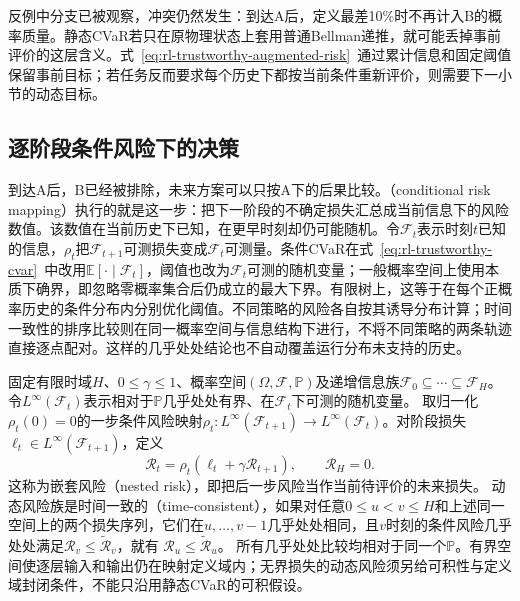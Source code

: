 反例中分支已被观察，冲突仍然发生：到达A后，定义最差10\%时不再计入B的概率质量。静态CVaR若只在原物理状态上套用普通Bellman递推，就可能丢掉事前评价的这层含义。式~\eqref{eq:rl-trustworthy-augmented-risk}~通过累计信息和固定阈值保留事前目标；若任务反而要求每个历史下都按当前条件重新评价，则需要下一小节的动态目标。

\subsection{逐阶段条件风险下的决策}
\label{sec:rl-trustworthy-dynamic-risk}

到达A后，B已经被排除，未来方案可以只按A下的后果比较。（conditional risk mapping）执行的就是这一步：把下一阶段的不确定损失汇总成当前信息下的风险数值。该数值在当前历史下已知，在更早时刻却仍可能随机。令$\mathcal F_t$表示时刻$t$已知的信息，$\rho_t$把$\mathcal F_{t+1}$可测损失变成$\mathcal F_t$可测量。条件CVaR在式~\eqref{eq:rl-trustworthy-cvar}~中改用$\mathbb E[\cdot\mid\mathcal F_t]$，阈值也改为$\mathcal F_t$可测的随机变量；一般概率空间上使用本质下确界，即忽略零概率集合后仍成立的最大下界。有限树上，这等于在每个正概率历史的条件分布内分别优化阈值。不同策略的风险各自按其诱导分布计算；时间一致性的排序比较则在同一概率空间与信息结构下进行，不将不同策略的两条轨迹直接逐点配对。这样的几乎处处结论也不自动覆盖运行分布未支持的历史。

\begin{definition}[嵌套风险与时间一致性]
  \label{def:rl-trustworthy-time-consistency}
  固定有限时域$H$、$0\leq\gamma\leq1$、概率空间$(\Omega,\mathcal F,\mathbb P)$及递增信息族$\mathcal F_0\subseteq\cdots\subseteq\mathcal F_H$。令$L^\infty(\mathcal F_t)$表示相对于$\mathbb P$几乎处处有界、在$\mathcal F_t$下可测的随机变量。
  取归一化$\rho_t(0)=0$的一步条件风险映射$\rho_t:L^\infty(\mathcal F_{t+1})\to L^\infty(\mathcal F_t)$。对阶段损失$\ell_t\in L^\infty(\mathcal F_{t+1})$，定义
  \[
    \mathcal R_t
      =\rho_t(\ell_t+\gamma\mathcal R_{t+1}),
      \qquad \mathcal R_H=0.
  \]
  这称为嵌套风险（nested risk），即把后一步风险当作当前待评价的未来损失。
  动态风险族是时间一致的（time-consistent），如果对任意$0\leq u<v\leq H$和上述同一空间上的两个损失序列，它们在$u,\ldots,v-1$几乎处处相同，且$v$时刻的条件风险几乎处处满足$\mathcal R_v\leq\widetilde{\mathcal R}_v$，就有
  $\mathcal R_u\leq\widetilde{\mathcal R}_u$。
  所有几乎处处比较均相对于同一个$\mathbb P$。有界空间使逐层输入和输出仍在映射定义域内；无界损失的动态风险须另给可积性与定义域封闭条件，不能只沿用静态CVaR的可积假设。
\end{definition}

